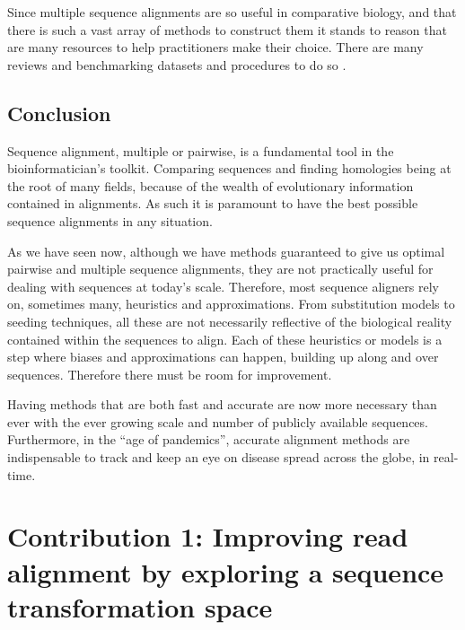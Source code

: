 \documentclass[
  11pt,
  twoside,
  BCOR=10mm,
  listof=totoc]{scrbook}
\begin{document}
Since multiple sequence alignments are so useful in comparative biology, and that there is such a vast array of methods to construct them it stands to reason that are many resources to help practitioners make their choice. There are many reviews and benchmarking datasets and procedures to do so \autocite{notredameRecentEvolutionsMultiple2007,notredameRecentProgressMultiple2002,edgarMultipleSequenceAlignment2006,paisAssessingEfficiencyMultiple2014,thompsonBAliBASEBenchmarkAlignment1999}.

\hypertarget{conclusion-1}{%
\section{Conclusion}\label{conclusion-1}}

Sequence alignment, multiple or pairwise, is a fundamental tool in the bioinformatician's toolkit. Comparing sequences and finding homologies being at the root of many fields, because of the wealth of evolutionary information contained in alignments. As such it is paramount to have the best possible sequence alignments in any situation.

As we have seen now, although we have methods guaranteed to give us optimal pairwise and multiple sequence alignments, they are not practically useful for dealing with sequences at today's scale. Therefore, most sequence aligners rely on, sometimes many, heuristics and approximations. From substitution models to seeding techniques, all these are not necessarily reflective of the biological reality contained within the sequences to align. Each of these heuristics or models is a step where biases and approximations can happen, building up along and over sequences. Therefore there must be room for improvement.

Having methods that are both fast and accurate are now more necessary than ever with the ever growing scale and number of publicly available sequences. Furthermore, in the ``age of pandemics'', accurate alignment methods are indispensable to track and keep an eye on disease spread across the globe, in real-time.

\printbibliography[segment=\therefsegment,heading=subbibintoc,title={References for chapter \thechapter}]

\hypertarget{HPC-paper}{%
\chapter{Contribution 1: Improving read alignment by exploring a sequence transformation space}\label{HPC-paper}}
\end{document}
